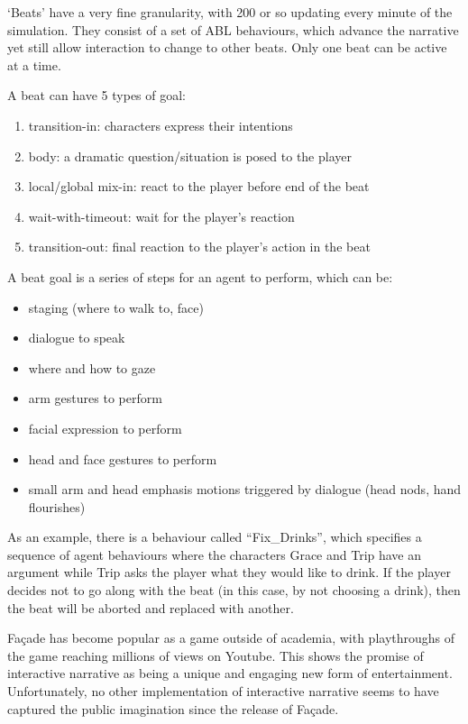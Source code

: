 `Beats' have a very fine granularity, with 200 or so updating every minute of the simulation. They consist of a set of ABL behaviours, which advance the narrative yet still allow interaction to change to other beats. Only one beat can be active at a time.

A beat can have 5 types of goal:

\begin{enumerate}
  \item transition-in: characters express their intentions
  \item body: a dramatic question/situation is posed to the player
  \item local/global mix-in: react to the player before end of the beat
  \item wait-with-timeout: wait for the player's reaction
  \item transition-out: final reaction to the player's action in the beat
\end{enumerate}

A beat goal is a series of steps for an agent to perform, which can be:

\begin{itemize}
  \item staging (where to walk to, face)
  \item dialogue to speak
  \item where and how to gaze
  \item arm gestures to perform
  \item facial expression to perform
  \item head and face gestures to perform
  \item small arm and head emphasis motions triggered by dialogue (head nods, hand flourishes)
\end{itemize}

As an example, there is a behaviour called ``Fix\_Drinks'', which specifies a sequence of agent behaviours where the characters Grace and Trip have an argument while Trip asks the player what they would like to drink. If the player decides not to go along with the beat (in this case, by not choosing a drink), then the beat will be aborted and replaced with another.

Fa\c{c}ade has become popular as a game outside of academia, with playthroughs of the game reaching millions of views on Youtube. This shows the promise of interactive narrative as being a unique and engaging new form of entertainment. Unfortunately, no other implementation of interactive narrative seems to have captured the public imagination since the release of Fa\c{c}ade.

